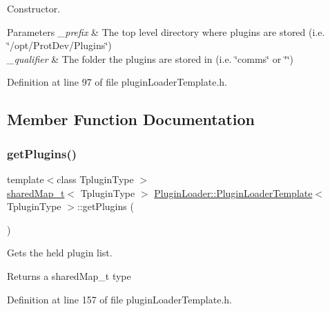 Constructor. 


\begin{DoxyParams}{Parameters}
{\em \+\_\+prefix} & The top level directory where plugins are stored (i.\+e. \char`\"{}/opt/\+Prot\+Dev/\+Plugins\char`\"{}) \\
\hline
{\em \+\_\+qualifier} & The folder the plugins are stored in (i.\+e. \char`\"{}comms\char`\"{} or \char`\"{}\char`\"{}) \\
\hline
\end{DoxyParams}


Definition at line 97 of file plugin\+Loader\+Template.\+h.



\subsection{Member Function Documentation}
\mbox{\label{classPluginLoader_1_1PluginLoaderTemplate_ae04498d46d4e9e1824eee156d8bef9d7}} 
\subsubsection{\texorpdfstring{getPlugins()}{getPlugins()}}
{\footnotesize\ttfamily template$<$class Tplugin\+Type $>$ \\
\mbox{\hyperlink{namespacePluginLoader_a8e505caea20d9f45155939545d29f6ba}{shared\+Map\+\_\+t}}$<$ Tplugin\+Type $>$ \mbox{\hyperlink{classPluginLoader_1_1PluginLoaderTemplate}{Plugin\+Loader\+::\+Plugin\+Loader\+Template}}$<$ Tplugin\+Type $>$\+::get\+Plugins (\begin{DoxyParamCaption}{ }\end{DoxyParamCaption})}



Gets the held plugin list. 

\begin{DoxyReturn}{Returns}
a shared\+Map\+\_\+t type 
\end{DoxyReturn}


Definition at line 157 of file plugin\+Loader\+Template.\+h.

\mbox{\label{classPluginLoader_1_1PluginLoaderTemplate_a8d969fc7c5f2848afef9a3a8255876ec}} 
